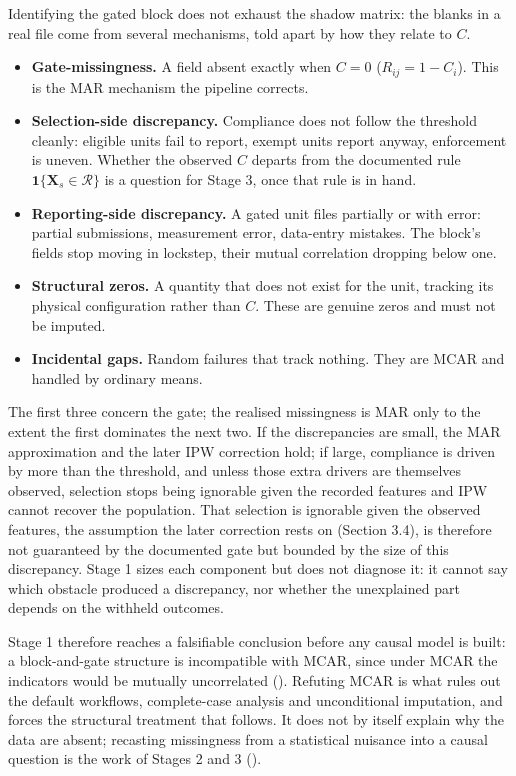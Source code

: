 Identifying the gated block does not exhaust the shadow matrix: the blanks in a real file come from several mechanisms, told apart by how they relate to $C$.

\begin{itemize}
  \item \textbf{Gate-missingness.} A field absent exactly when $C = 0$ ($R_{ij} = 1 - C_i$). This is the MAR mechanism the pipeline corrects.
  \item \textbf{Selection-side discrepancy.} Compliance does not follow the threshold cleanly: eligible units fail to report, exempt units report anyway, enforcement is uneven. Whether the observed $C$ departs from the documented rule $\mathbf{1}\{\mathbf{X}_s \in \mathcal{R}\}$ is a question for Stage 3, once that rule is in hand.
  \item \textbf{Reporting-side discrepancy.} A gated unit files partially or with error: partial submissions, measurement error, data-entry mistakes. The block's fields stop moving in lockstep, their mutual correlation dropping below one.
  \item \textbf{Structural zeros.} A quantity that does not exist for the unit, tracking its physical configuration rather than $C$. These are genuine zeros and must not be imputed.
  \item \textbf{Incidental gaps.} Random failures that track nothing. They are MCAR and handled by ordinary means.
\end{itemize}

The first three concern the gate; the realised missingness is MAR only to the extent the first dominates the next two. If the discrepancies are small, the MAR approximation and the later IPW correction hold; if large, compliance is driven by more than the threshold, and unless those extra drivers are themselves observed, selection stops being ignorable given the recorded features and IPW cannot recover the population. That selection is ignorable given the observed features, the assumption the later correction rests on (Section 3.4), is therefore not guaranteed by the documented gate but bounded by the size of this discrepancy. Stage 1 sizes each component but does not diagnose it: it cannot say which obstacle produced a discrepancy, nor whether the unexplained part depends on the withheld outcomes.

Stage 1 therefore reaches a falsifiable conclusion before any causal model is built: a block-and-gate structure is incompatible with MCAR, since under MCAR the indicators would be mutually uncorrelated (). Refuting MCAR is what rules out the default workflows, complete-case analysis and unconditional imputation, and forces the structural treatment that follows. It does not by itself explain why the data are absent; recasting missingness from a statistical nuisance into a causal question is the work of Stages 2 and 3 ().

